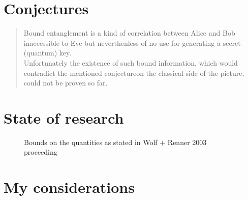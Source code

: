 \section{Conjectures}
			\begin{quotation}
			Bound entanglement is a kind of correlation between Alice and Bob inaccessible to Eve but neverthenless of no use for generating a secret (quantum) key.\\
			Unfortunately the existence of such bound information, which would contradict the mentioned conjecture\footnotemark on the classical side of the picture, could not be proven so far.
		\end{quotation}
		
		
	\section{State of research}
		\begin{figure}[h]
			\centering
			
			\caption{Bounds on the quantities as stated in Wolf + Renner 2003 proceeding}
		\end{figure}
	\section{My considerations}
